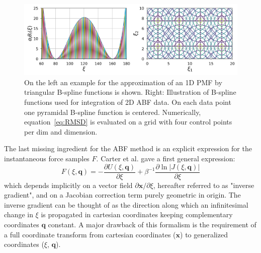 \begin{figure}[H]
    \centering
    \includegraphics[width=1\textwidth]{bilder/FEM}
    \caption{
      On the left an example for the approximation of an 1D PMF by triangular B-spline functions is shown.
      Right: Illustration of B-spline functions used for integration of 2D ABF data. On each data point one pyramidal B-spline function is centered. Numerically, equation~\ref{eq:RMSD} is evaluated on a grid with four control points per dim and dimension.
    }
\label{fig:FEM}%
\end{figure}
The last missing ingredient for the ABF method is an explicit expression for the instantaneous force samples $F$. Carter et al.\autocite{carter1989constrained} gave a first general expression:
\begin{equation}
  F(\xi,\textbf{q}) = -\frac{\partial U(\xi,\textbf{q})}{\partial \xi} + \beta^{-1} \frac{\partial \ln|J(\xi,\textbf{q})|}{\partial\xi} \label{eq:instforce old}
\end{equation}
which depends implicitly on a vector field $\partial \textbf{x} / \partial \xi$, hereafter referred to as "inverse gradient", and on a Jacobian correction term purely geometric in origin. The inverse gradient can be thought of as the direction along which an infinitesimal change in $\xi$ is propagated in cartesian coordinates keeping complementary coordinates $\textbf{q}$ constant. A major drawback of this formalism is the requirement of a full coordinate transform from cartesian coordinates ($\textbf{x}$) to generalized coordinates ($\xi$, $\textbf{q}$).

